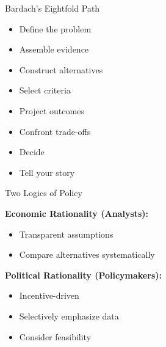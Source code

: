 \documentclass[10pt]{beamer}
\begin{document}
\begin{frame}{Bardach’s Eightfold Path}


\begin{itemize}
  \item Define the problem
  \item Assemble evidence
  \item Construct alternatives
  \item Select criteria
  \item Project outcomes
  \item Confront trade-offs
  \item Decide
  \item Tell your story
\end{itemize}

\end{frame}


\begin{frame}{Two Logics of Policy}

\begin{block}{}
    \textbf{Economic Rationality (Analysts):}
    \begin{itemize}
        \item Transparent assumptions
        \item Compare alternatives systematically
    \end{itemize}

    \textbf{Political Rationality (Policymakers):}
    \begin{itemize}
        \item Incentive-driven
        \item Selectively emphasize data
        \item Consider feasibility
    \end{itemize}
\end{block}

\end{frame}
\end{document}
